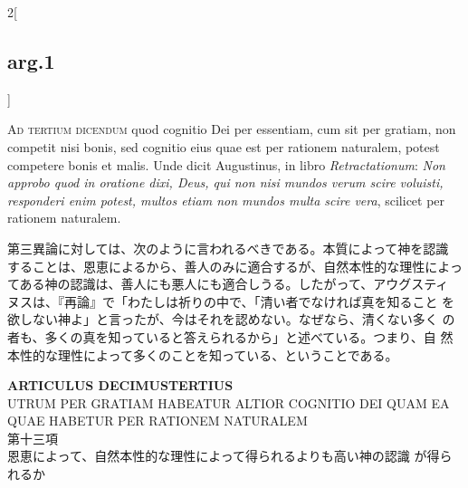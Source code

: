 \documentclass[paper=a4paper,fontsize=10pt,jafontsize=9pt,titlepage]{jlreq}
\begin{document}
\begin{paracol}{2}[\subsection{arg.1}]
\switchcolumn*[\subsection{ad.3}]

{\scshape Ad tertium dicendum} quod cognitio Dei per essentiam, cum sit per
gratiam, non competit nisi bonis, sed cognitio eius quae est per
rationem naturalem, potest competere bonis et malis. Unde dicit
Augustinus, in libro {\itshape Retractationum}: {\itshape Non approbo quod in
oratione dixi, Deus, qui non nisi mundos verum scire voluisti,
responderi enim potest, multos etiam non mundos multa scire vera},
scilicet per rationem naturalem.

\switchcolumn

第三異論に対しては、次のように言われるべきである。本質によって神を認識
することは、恩恵によるから、善人のみに適合するが、自然本性的な理性によっ
てある神の認識は、善人にも悪人にも適合しうる。したがって、アウグスティ
ヌスは、『再論』で「わたしは祈りの中で、「清い者でなければ真を知ること
を欲しない神よ」と言ったが、今はそれを認めない。なぜなら、清くない多く
の者も、多くの真を知っていると答えられるから」と述べている。つまり、自
然本性的な理性によって多くのことを知っている、ということである。

\end{paracol}

\newpage
{}

\begin{center}
 {\Large {\bfseries ARTICULUS DECIMUSTERTIUS}}\\
{\large UTRUM PER GRATIAM HABEATUR ALTIOR COGNITIO DEI QUAM EA QUAE
 HABETUR PER RATIONEM NATURALEM}\\
{\large 第十三項\\恩恵によって、自然本性的な理性によって得られるよりも高い神の認識
 が得られるか}
\end{center}

{}
\setcounter{section}{13}
\setcounter{subsection}{0}
\end{document}

